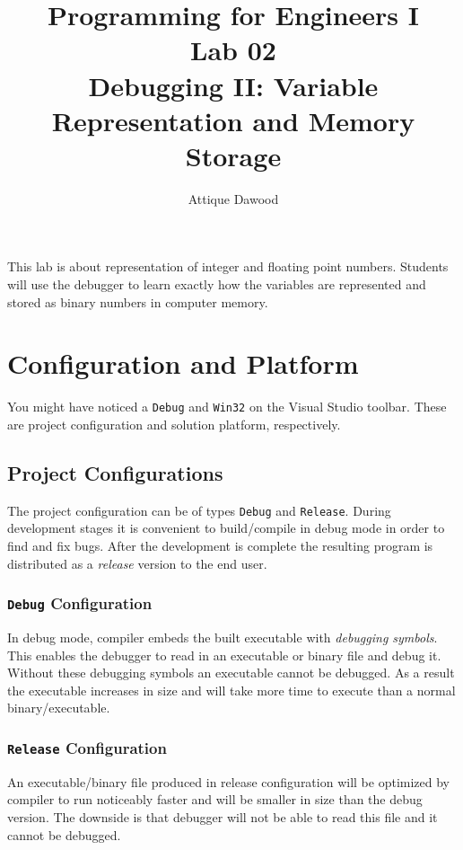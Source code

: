 \documentclass{article}
\title{Programming for Engineers I\\Lab 02\\Debugging II: Variable Representation and Memory Storage}
\author{Attique Dawood}
\begin{document}
\maketitle

This lab is about representation of integer and floating point numbers. Students will use the debugger to learn exactly how the variables are represented and stored as binary numbers in computer memory\footnotemark.


\section{Configuration and Platform}
You might have noticed a \verb|Debug| and \verb|Win32| on the Visual Studio toolbar. These are project configuration and solution platform, respectively.
\subsection{Project Configurations}
The project configuration can be of types \verb|Debug| and \verb|Release|. During development stages it is convenient to build/compile in debug mode in order to find and fix bugs. After the development is complete the resulting program is distributed as a \emph{release} version to the end user.
\subsubsection{\texttt{Debug} Configuration}
In debug mode, compiler embeds the built executable with \emph{debugging symbols}. This enables the debugger to read in an executable or binary file and debug it. Without these debugging symbols an executable cannot be debugged. As a result the executable increases in size and will take more time to execute than a normal binary/executable.
\subsubsection{\texttt{Release} Configuration}
An executable/binary file produced in release configuration will be optimized by compiler to run noticeably faster and will be smaller in size than the debug version. The downside is that debugger will not be able to read this file and it cannot be debugged.
\end{document}
